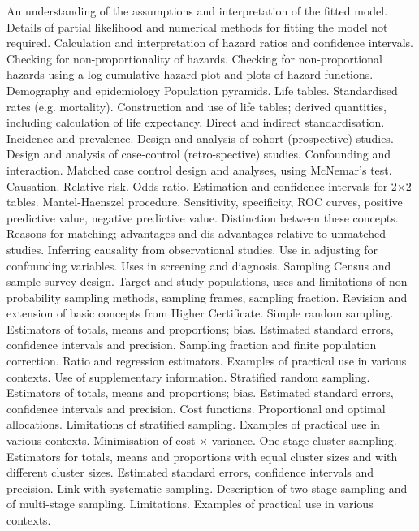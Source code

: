 An understanding of the assumptions and interpretation of the fitted model. Details of partial likelihood and numerical methods for fitting the model not required. Calculation and interpretation of hazard ratios and confidence intervals.
Checking for non-proportionality of hazards.
Checking for non-proportional hazards using a log cumulative hazard plot and plots of hazard functions.
Demography and epidemiology
Population pyramids.
Life tables.
Standardised rates (e.g. mortality).
Construction and use of life tables; derived quantities, including calculation of life expectancy. Direct and indirect standardisation.
Incidence and prevalence.
Design and analysis of cohort (prospective) studies.
Design and analysis of case-control (retro-spective) studies.
Confounding and interaction.
Matched case control design and analyses, using McNemar's test.
Causation.
Relative risk. Odds ratio. Estimation and confidence intervals for 2×2 tables.
Mantel-Haenszel procedure.
Sensitivity, specificity, ROC curves, positive predictive value, negative predictive value.
Distinction between these concepts.
Reasons for matching; advantages and dis-advantages relative to unmatched studies.
Inferring causality from observational studies.
Use in adjusting for confounding variables.
Uses in screening and diagnosis.
Sampling
Census and sample survey design. Target and study populations, uses and limitations of non-probability sampling methods, sampling frames, sampling fraction.
Revision and extension of basic concepts from Higher Certificate.
Simple random sampling. Estimators of totals, means and proportions; bias. Estimated standard errors, confidence intervals and precision. Sampling fraction and finite population correction. Ratio and regression estimators.
Examples of practical use in various contexts.
Use of supplementary information.
Stratified random sampling. Estimators of totals, means and proportions; bias. Estimated standard errors, confidence intervals and precision. Cost functions. Proportional and optimal allocations. Limitations of stratified sampling.
Examples of practical use in various contexts.
Minimisation of cost × variance.
One-stage cluster sampling. Estimators for totals, means and proportions with equal cluster sizes and with different cluster sizes. Estimated standard errors, confidence intervals and precision. Link with systematic sampling. Description of two-stage sampling and of multi-stage sampling. Limitations.
Examples of practical use in various contexts.

